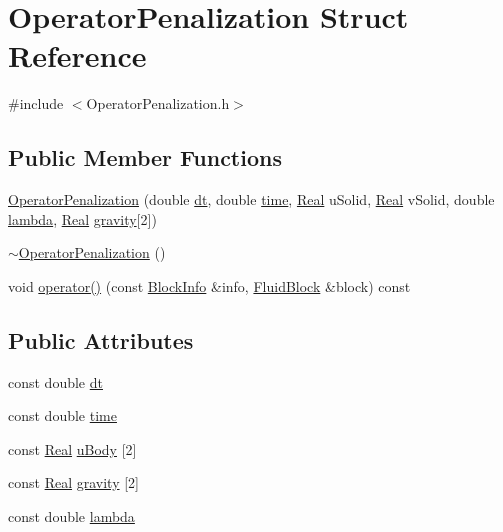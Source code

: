 \hypertarget{struct_operator_penalization}{}\section{Operator\+Penalization Struct Reference}
\label{struct_operator_penalization}


{\ttfamily \#include $<$Operator\+Penalization.\+h$>$}

\subsection*{Public Member Functions}
\begin{DoxyCompactItemize}
\item 
\hyperlink{struct_operator_penalization_ae58bb35e9c3a25a56b048f72ea2c30c1}{Operator\+Penalization} (double \hyperlink{struct_operator_penalization_a8d07c1013f8f7590953835eb0447ce20}{dt}, double \hyperlink{struct_operator_penalization_ae71ef9456d8ef4f2b054da734444581c}{time}, \hyperlink{_h_d_f5_dumper_8h_a445a5f0e2a34c9d97d69a3c2d1957907}{Real} u\+Solid, \hyperlink{_h_d_f5_dumper_8h_a445a5f0e2a34c9d97d69a3c2d1957907}{Real} v\+Solid, double \hyperlink{struct_operator_penalization_a96728df7ce3f84d8c1afb8d75ec3e864}{lambda}, \hyperlink{_h_d_f5_dumper_8h_a445a5f0e2a34c9d97d69a3c2d1957907}{Real} \hyperlink{struct_operator_penalization_a555393947fe7c5d6738699f5bbc5d29b}{gravity}\mbox{[}2\mbox{]})
\item 
\hyperlink{struct_operator_penalization_af9792ac8b8f0c8f301cb0dcb9c57e81a}{$\sim$\+Operator\+Penalization} ()
\item 
void \hyperlink{struct_operator_penalization_a55a7fe1ef7cfa3c48c98b0145cd24f00}{operator()} (const \hyperlink{struct_block_info}{Block\+Info} \&info, \hyperlink{struct_fluid_block}{Fluid\+Block} \&block) const 
\end{DoxyCompactItemize}
\subsection*{Public Attributes}
\begin{DoxyCompactItemize}
\item 
const double \hyperlink{struct_operator_penalization_a8d07c1013f8f7590953835eb0447ce20}{dt}
\item 
const double \hyperlink{struct_operator_penalization_ae71ef9456d8ef4f2b054da734444581c}{time}
\item 
const \hyperlink{_h_d_f5_dumper_8h_a445a5f0e2a34c9d97d69a3c2d1957907}{Real} \hyperlink{struct_operator_penalization_a4a7db22b3ff2eba63d29c4484b6fbd0d}{u\+Body} \mbox{[}2\mbox{]}
\item 
const \hyperlink{_h_d_f5_dumper_8h_a445a5f0e2a34c9d97d69a3c2d1957907}{Real} \hyperlink{struct_operator_penalization_a555393947fe7c5d6738699f5bbc5d29b}{gravity} \mbox{[}2\mbox{]}
\item 
const double \hyperlink{struct_operator_penalization_a96728df7ce3f84d8c1afb8d75ec3e864}{lambda}
\end{DoxyCompactItemize}


